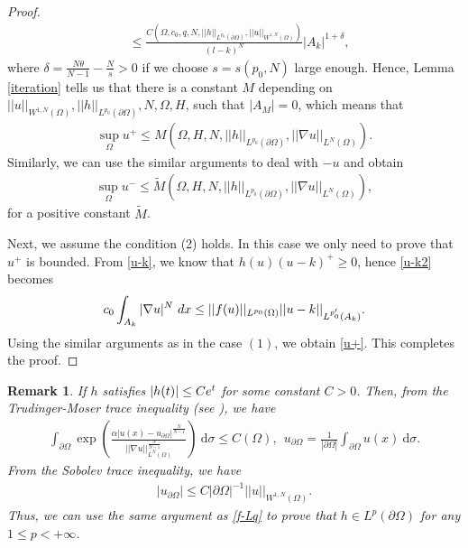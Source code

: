 \documentclass[10pt,a4paper]{amsart}
\numberwithin{equation}{section}
\newtheorem{rmk}[thm]{Remark}
\newcommand{\pa}{\partial}
\newcommand{\e}{\textup{e}}
\newcommand{\dx}{\textup{d}x}
\begin{document}
\begin{proof}
\begin{align*}
        & \leq \frac{C(\Omega, c_0, q, N , ||h||_{L^{p_0}(\pa\Omega)}, || u||_{W^{1,N}(\Omega)})}{(l-k)^N} |A_k|^{1+ \delta},
    \end{align*}
    where $\delta = \frac{N\theta}{N-1} - \frac{N}{s}>0$ if we choose $s= s(p_0,N)$ large enough. Hence, Lemma \ref{iteration} tells us that there is a constant $M$ depending on $|| u||_{W^{1,N}(\Omega)}, ||h||_{L^{p_0}(\pa\Omega)},  N, \Omega, H$, such that $|A_M| = 0$, which means that
    \begin{align}\label{u+}
        \sup_{\Omega} u^+  \leq M(\Omega, H, N, ||h||_{L^{p_0}(\pa\Omega)},||\nabla u||_{L^N(\Omega)}).
    \end{align}
    Similarly, we can use the similar arguments to deal with $-u$ and obtain
    \begin{align}\label{u-}
        \sup_{\Omega} u^-  \leq \tilde{M} (\Omega, H, N, ||h||_{L^{p_0}(\pa\Omega)},||\nabla u||_{L^N(\Omega)}),
    \end{align}
    for a positive constant $\tilde{M}$.

     Next, we assume the condition (2) holds. In this case we only need to prove that $u^+$ is bounded. From \eqref{u-k}, we know that $h(u)(u-k)^+ \geq 0$, hence \eqref{u-k2} becomes
     \begin{align*}
         c_0 \int_{A_k} |\nabla u|^N \ \dx  \leq ||f(u)||_{L^{p_0}(\Omega)} ||u-k||_{L^{p_0'}(A_k)}.
     \end{align*}
     Using the similar arguments as in the case $(1)$, we obtain \eqref{u+}. This completes the proof.
\end{proof}

\begin{rmk}
    If $h$ satisfies $|h(t)| \leq C\e^{t}$ for some constant $C>0$. Then, from the Trudinger-Moser trace inequality (see \cite{C2008}), we have
    \begin{align*}
        \int_{\partial \Omega} \exp\left(\frac{\alpha |u(x) - u_{\pa \Omega}|^{\frac{N}{N-1}}}{||\nabla u||_{L^N(\Omega)}^{\frac{N}{N-1}}} \right)  \ \text{d} \sigma \leq C(\Omega), \ \ u_{\partial \Omega} = \frac{1}{|\partial \Omega|} \int_{\partial \Omega} u(x) \ \text{d} \sigma.
    \end{align*}
    From the Sobolev trace inequality, we have
    \begin{align*}
        |u_{\pa \Omega}| \leq C|\pa \Omega|^{-1} ||u||_{W^{1,N}(\Omega)}.
    \end{align*}
    Thus, we can use the same argument as \eqref{f-Lq} to prove that $h \in L^p(\partial \Omega)$ for any $1\leq p < +\infty$.
\end{rmk}
\end{document}
